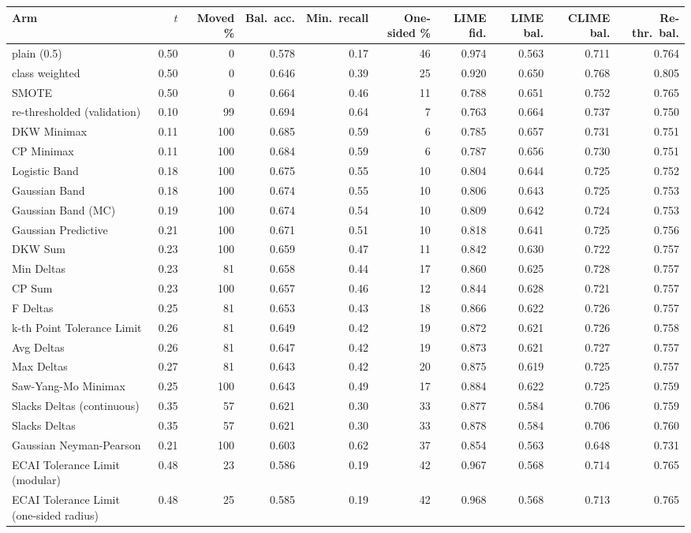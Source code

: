 \begin{tabular}{@{}lrrrrrrrrr@{}}
  \toprule
  Arm & $t$ & Moved \% & Bal.\ acc. & Min.\ recall & One-sided \% & LIME fid. & LIME bal. & CLIME bal. & Re-thr.\ bal. \\
  \midrule
  plain (0.5) & 0.50 & 0 & 0.578 & 0.17 & 46 & 0.974 & 0.563 & 0.711 & 0.764 \\
  class weighted & 0.50 & 0 & 0.646 & 0.39 & 25 & 0.920 & 0.650 & 0.768 & 0.805 \\
  SMOTE & 0.50 & 0 & 0.664 & 0.46 & 11 & 0.788 & 0.651 & 0.752 & 0.765 \\
  re-thresholded (validation) & 0.10 & 99 & 0.694 & 0.64 & 7 & 0.763 & 0.664 & 0.737 & 0.750 \\
  \midrule
  DKW Minimax & 0.11 & 100 & 0.685 & 0.59 & 6 & 0.785 & 0.657 & 0.731 & 0.751 \\
  CP Minimax & 0.11 & 100 & 0.684 & 0.59 & 6 & 0.787 & 0.656 & 0.730 & 0.751 \\
  Logistic Band & 0.18 & 100 & 0.675 & 0.55 & 10 & 0.804 & 0.644 & 0.725 & 0.752 \\
  Gaussian Band & 0.18 & 100 & 0.674 & 0.55 & 10 & 0.806 & 0.643 & 0.725 & 0.753 \\
  Gaussian Band (MC) & 0.19 & 100 & 0.674 & 0.54 & 10 & 0.809 & 0.642 & 0.724 & 0.753 \\
  Gaussian Predictive & 0.21 & 100 & 0.671 & 0.51 & 10 & 0.818 & 0.641 & 0.725 & 0.756 \\
  DKW Sum & 0.23 & 100 & 0.659 & 0.47 & 11 & 0.842 & 0.630 & 0.722 & 0.757 \\
  Min Deltas & 0.23 & 81 & 0.658 & 0.44 & 17 & 0.860 & 0.625 & 0.728 & 0.757 \\
  CP Sum & 0.23 & 100 & 0.657 & 0.46 & 12 & 0.844 & 0.628 & 0.721 & 0.757 \\
  F Deltas & 0.25 & 81 & 0.653 & 0.43 & 18 & 0.866 & 0.622 & 0.726 & 0.757 \\
  k-th Point Tolerance Limit & 0.26 & 81 & 0.649 & 0.42 & 19 & 0.872 & 0.621 & 0.726 & 0.758 \\
  Avg Deltas & 0.26 & 81 & 0.647 & 0.42 & 19 & 0.873 & 0.621 & 0.727 & 0.757 \\
  Max Deltas & 0.27 & 81 & 0.643 & 0.42 & 20 & 0.875 & 0.619 & 0.725 & 0.757 \\
  Saw-Yang-Mo Minimax & 0.25 & 100 & 0.643 & 0.49 & 17 & 0.884 & 0.622 & 0.725 & 0.759 \\
  Slacks Deltas (continuous) & 0.35 & 57 & 0.621 & 0.30 & 33 & 0.877 & 0.584 & 0.706 & 0.759 \\
  Slacks Deltas & 0.35 & 57 & 0.621 & 0.30 & 33 & 0.878 & 0.584 & 0.706 & 0.760 \\
  Gaussian Neyman-Pearson & 0.21 & 100 & 0.603 & 0.62 & 37 & 0.854 & 0.563 & 0.648 & 0.731 \\
  ECAI Tolerance Limit (modular) & 0.48 & 23 & 0.586 & 0.19 & 42 & 0.967 & 0.568 & 0.714 & 0.765 \\
  ECAI Tolerance Limit (one-sided radius) & 0.48 & 25 & 0.585 & 0.19 & 42 & 0.968 & 0.568 & 0.713 & 0.765 \\
  \bottomrule
\end{tabular}
